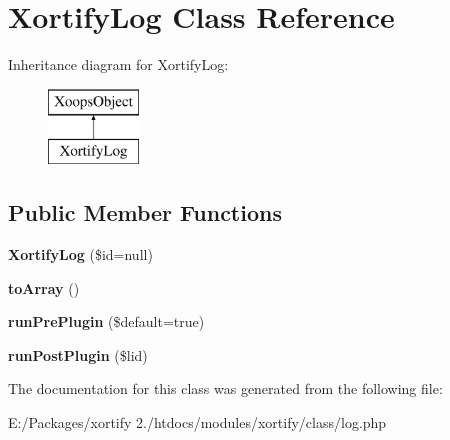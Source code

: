 \hypertarget{class_xortify_log}{\section{Xortify\-Log Class Reference}
\label{class_xortify_log}
}
Inheritance diagram for Xortify\-Log\-:\begin{figure}[H]
\begin{center}
\leavevmode
\includegraphics[height=2.000000cm]{class_xortify_log}
\end{center}
\end{figure}
\subsection*{Public Member Functions}
\begin{DoxyCompactItemize}
\item 
\hypertarget{class_xortify_log_a0b4ac901531d2303b872a98b0b440906}{{\bfseries Xortify\-Log} (\$id=null)}\label{class_xortify_log_a0b4ac901531d2303b872a98b0b440906}

\item 
\hypertarget{class_xortify_log_a62e109ed60526a6fdf9100c22a47b157}{{\bfseries to\-Array} ()}\label{class_xortify_log_a62e109ed60526a6fdf9100c22a47b157}

\item 
\hypertarget{class_xortify_log_aa4429a8e79fa748a036492be4d2cf82c}{{\bfseries run\-Pre\-Plugin} (\$default=true)}\label{class_xortify_log_aa4429a8e79fa748a036492be4d2cf82c}

\item 
\hypertarget{class_xortify_log_a5dfd04bcc47a20b84ad5e7ed04db58e5}{{\bfseries run\-Post\-Plugin} (\$lid)}\label{class_xortify_log_a5dfd04bcc47a20b84ad5e7ed04db58e5}

\end{DoxyCompactItemize}


The documentation for this class was generated from the following file\-:\begin{DoxyCompactItemize}
\item 
E\-:/\-Packages/xortify 2./htdocs/modules/xortify/class/log.\-php\end{DoxyCompactItemize}
